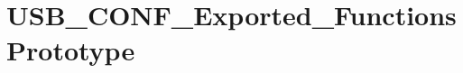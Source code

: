 \hypertarget{group__USB__CONF__Exported__FunctionsPrototype}{\section{U\-S\-B\-\_\-\-C\-O\-N\-F\-\_\-\-Exported\-\_\-\-Functions\-Prototype}
\label{group__USB__CONF__Exported__FunctionsPrototype}
}
